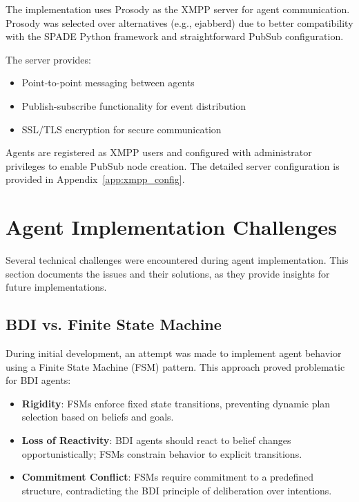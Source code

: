 The implementation uses Prosody as the \ac{XMPP} server for agent communication. Prosody was selected over alternatives (e.g., ejabberd) due to better compatibility with the SPADE Python framework and straightforward PubSub configuration.

The server provides:
\begin{itemize}
    \item Point-to-point messaging between agents
    \item Publish-subscribe functionality for event distribution
    \item SSL/TLS encryption for secure communication
\end{itemize}

Agents are registered as \ac{XMPP} users and configured with administrator privileges to enable PubSub node creation. The detailed server configuration is provided in Appendix~\ref{app:xmpp_config}.

\section{Agent Implementation Challenges}
\label{sec:agent_challenges}

Several technical challenges were encountered during agent implementation. This section documents the issues and their solutions, as they provide insights for future implementations.

\subsection{BDI vs. Finite State Machine}

During initial development, an attempt was made to implement agent behavior using a Finite State Machine (FSM) pattern. This approach proved problematic for \ac{BDI} agents:

\begin{itemize}
    \item \textbf{Rigidity}: FSMs enforce fixed state transitions, preventing dynamic plan selection based on beliefs and goals.
    \item \textbf{Loss of Reactivity}: \ac{BDI} agents should react to belief changes opportunistically; FSMs constrain behavior to explicit transitions.
    \item \textbf{Commitment Conflict}: FSMs require commitment to a predefined structure, contradicting the \ac{BDI} principle of deliberation over intentions.
\end{itemize}

